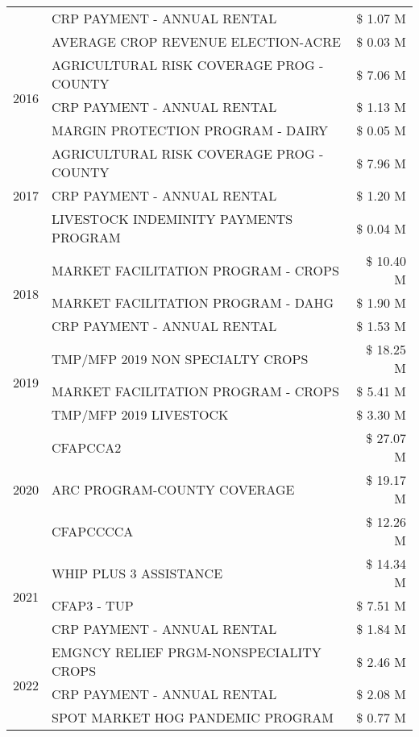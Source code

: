 \begin{tabular}{llr}
 & CRP PAYMENT - ANNUAL RENTAL & \$ 1.07 M \\
 & AVERAGE CROP REVENUE ELECTION-ACRE & \$ 0.03 M \\
\cline{1-3}
\multirow[t]{3}{*}{2016} & AGRICULTURAL RISK COVERAGE PROG - COUNTY & \$ 7.06 M \\
 & CRP PAYMENT - ANNUAL RENTAL & \$ 1.13 M \\
 & MARGIN PROTECTION PROGRAM - DAIRY & \$ 0.05 M \\
\cline{1-3}
\multirow[t]{3}{*}{2017} & AGRICULTURAL RISK COVERAGE PROG - COUNTY & \$ 7.96 M \\
 & CRP PAYMENT - ANNUAL RENTAL & \$ 1.20 M \\
 & LIVESTOCK INDEMINITY PAYMENTS PROGRAM & \$ 0.04 M \\
\cline{1-3}
\multirow[t]{3}{*}{2018} & MARKET FACILITATION PROGRAM - CROPS & \$ 10.40 M \\
 & MARKET FACILITATION PROGRAM - DAHG & \$ 1.90 M \\
 & CRP PAYMENT - ANNUAL RENTAL & \$ 1.53 M \\
\cline{1-3}
\multirow[t]{3}{*}{2019} & TMP/MFP 2019 NON SPECIALTY CROPS & \$ 18.25 M \\
 & MARKET FACILITATION PROGRAM - CROPS & \$ 5.41 M \\
 & TMP/MFP 2019 LIVESTOCK & \$ 3.30 M \\
\cline{1-3}
\multirow[t]{3}{*}{2020} & CFAPCCA2 & \$ 27.07 M \\
 & ARC PROGRAM-COUNTY COVERAGE & \$ 19.17 M \\
 & CFAPCCCCA & \$ 12.26 M \\
\cline{1-3}
\multirow[t]{3}{*}{2021} & WHIP PLUS 3 ASSISTANCE & \$ 14.34 M \\
 & CFAP3 - TUP & \$ 7.51 M \\
 & CRP PAYMENT - ANNUAL RENTAL & \$ 1.84 M \\
\cline{1-3}
\multirow[t]{3}{*}{2022} & EMGNCY RELIEF PRGM-NONSPECIALITY CROPS & \$ 2.46 M \\
 & CRP PAYMENT - ANNUAL RENTAL & \$ 2.08 M \\
 & SPOT MARKET HOG PANDEMIC PROGRAM & \$ 0.77 M \\
\cline{1-3}
\bottomrule
\end{tabular}
